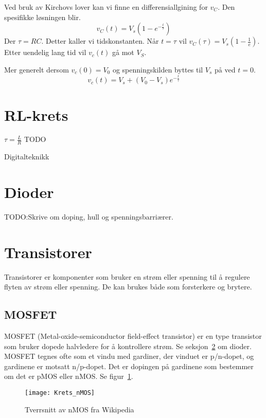 \documentclass[12pt,a4paper,norsk]{article}
\begin{document}
Ved bruk av Kirchovs lover kan vi finne en differensiallgining for $v_C$.
Den spesifikke løsningen blir.
\[v_C(t) = V_s(1 - e^{-\frac{t}{\tau}})\]
Der $\tau = RC$. Detter kaller vi tidskonstanten. Når $t = \tau$ vil
$v_C(\tau) = V_s(1-\frac{1}{e})$. Etter uendelig lang tid vil $v_c(t)$ gå mot $V_S$.

Mer generelt dersom $v_c(0)=V_0$ og spenningskilden byttes til $V_s$ på ved $t=0$.
\[v_c(t) = V_s + (V_0-V_s)e^{-\frac{t}{\tau}}\]

\section{RL-krets}
$\tau = \frac{L}{R}$ TODO

\clearpage
{}
\begin{center}
  {\LARGE Digitalteknikk}
\end{center}

\section{Dioder}\label{sec:dioder}
TODO\@:Skrive om doping, hull og spenningsbarriærer.

\section{Transistorer}
Transistorer er komponenter som bruker en strøm eller spenning til å regulere
flyten av strøm eller spenning. De kan brukes både som forsterkere og brytere.

\subsection{MOSFET}
MOSFET (Metal-oxide-semiconductor field-effect transistor) er en type
transistor som bruker dopede halvledere for å kontrollere strøm. Se
seksjon~\ref{sec:dioder} om dioder. MOSFET tegnes ofte som et vindu med
gardiner, der vinduet er p/n-dopet, og gardinene er motsatt n/p-dopet. Det er
dopingen på gardinene som bestemmer om det er pMOS eller nMOS. Se figur~\ref{fig:nMOS}.

\begin{figure}[hbt!]
  \centering
  \texttt{[image: Krets\_nMOS]}
  \caption{Tverrsnitt av nMOS fra Wikipedia\label{fig:nMOS}}
\end{figure}
\end{document}
